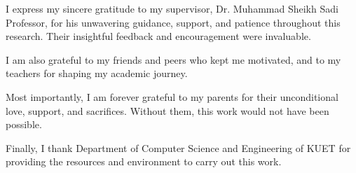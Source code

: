 
    
    I express my sincere gratitude to my supervisor, Dr. Muhammad Sheikh Sadi Professor, for his unwavering guidance, support, and patience throughout this research. Their insightful feedback and encouragement were invaluable.

    I am also grateful to my friends and peers who kept me motivated, and to my teachers for shaping my academic journey.

    Most importantly, I am forever grateful to my parents for their unconditional love, support, and sacrifices. Without them, this work would not have been possible.

    Finally, I thank Department of Computer Science and Engineering of KUET for providing the resources and environment to carry out this work.
